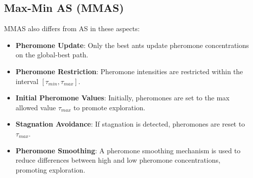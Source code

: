 \subsection*{Max-Min AS (MMAS)}
MMAS also differs from AS in these aspects:
    \begin{itemize}
        \item \textbf{Pheromone Update}: Only the best ants update pheromone concentrations on the global-best path.
        \item \textbf{Pheromone Restriction}: Pheromone intensities are restricted within the interval $[\tau_{min}, \tau_{max}]$.
        \item \textbf{Initial Pheromone Values}: Initially, pheromones are set to the max allowed value $\tau_{max}$ to promote exploration.
         \item \textbf{Stagnation Avoidance}: If stagnation is detected, pheromones are reset to $\tau_{max}$.
         \item \textbf{Pheromone Smoothing}: A pheromone smoothing mechanism is used to reduce differences between high and low pheromone concentrations, promoting exploration.
    \end{itemize}
